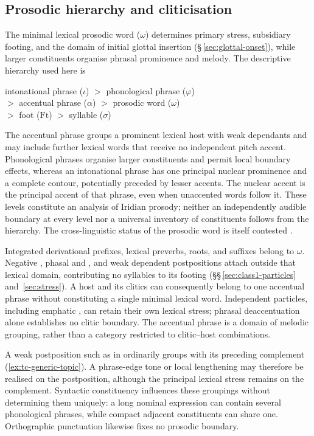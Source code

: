 \subsection{Prosodic hierarchy and cliticisation}\label{sec:prosodic-domains}

The minimal lexical prosodic word ($\omega$) determines primary stress,
subsidiary footing, and the domain of initial glottal insertion
(§\,\ref{sec:glottal-onset}), while larger constituents organise phrasal prominence
and melody. The descriptive hierarchy used here is
\begin{center}
intonational phrase ($\iota$) $>$ phonological phrase ($\varphi$)\\
$>$ accentual phrase ($\alpha$) $>$ prosodic word ($\omega$)\\
$>$ foot ($\mathrm{Ft}$) $>$ syllable ($\sigma$)
\end{center}
The accentual phrase groups a prominent lexical host with weak dependants
and may include further lexical words that receive no independent pitch
accent. Phonological phrases organise larger constituents and permit local
boundary effects, whereas an intonational phrase has one principal nuclear
prominence and a complete contour, potentially preceded by lesser accents.
The nuclear accent is the principal accent of that phrase, even when
unaccented words follow it. These levels constitute an analysis of Iridian
prosody; neither an independently audible boundary at every level nor a
universal inventory of constituents follows from the hierarchy. The
cross-linguistic status of the prosodic word is itself contested
\cite{schieringetal2010}.

Integrated derivational prefixes, lexical preverbs, roots, and suffixes
belong to $\omega$. Negative , phasal  and ,
and weak dependent postpositions attach outside that lexical domain,
contributing no syllables to its footing
(§§\,\ref{sec:class1-particles} and~\ref{sec:stress}).
A host and its clitics can consequently belong to one accentual phrase
without constituting a single minimal lexical word. Independent particles,
including emphatic , can retain their own lexical stress; phrasal
deaccentuation alone establishes no clitic boundary. The accentual phrase
is a domain of melodic grouping, rather than a category restricted to
clitic--host combinations.

A weak postposition such as  in 
 ordinarily groups with its preceding complement
(\ref{ex:tc-generic-topic}). A phrase-edge tone or local lengthening may
therefore be realised on the postposition, although the principal lexical
stress remains on the complement. Syntactic constituency influences these
groupings without determining them uniquely: a long nominal expression
can contain several phonological phrases, while compact adjacent
constituents can share one. Orthographic punctuation likewise fixes no
prosodic boundary.

